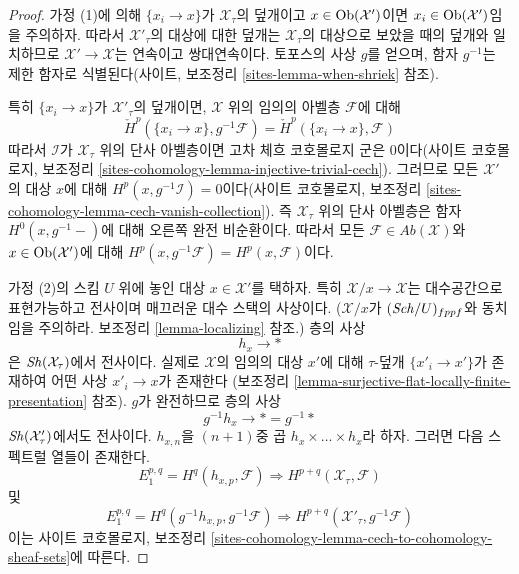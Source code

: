 \begin{proof}
가정 (1)에 의해 $\{x_i \to x\}$가 $\mathcal{X}_\tau$의 덮개이고
$x \in \mathop{\mathrm{Ob}}\nolimits(\mathcal{X}')$이면 $x_i \in \mathop{\mathrm{Ob}}\nolimits(\mathcal{X}')$임을
주의하자. 따라서 $\mathcal{X}'_\tau$의 대상에 대한 덮개는
$\mathcal{X}_\tau$의 대상으로 보았을 때의 덮개와 일치하므로
$\mathcal{X}' \to \mathcal{X}$는 연속이고 쌍대연속이다.
토포스의 사상 $g$를 얻으며, 함자 $g^{-1}$는 제한 함자로
식별된다(사이트, 보조정리 \ref{sites-lemma-when-shriek} 참조).

\medskip\noindent
특히 $\{x_i \to x\}$가 $\mathcal{X}'_\tau$의 덮개이면,
$\mathcal{X}$ 위의 임의의 아벨층 $\mathcal{F}$에 대해
$$
\check H^p(\{x_i \to x\}, g^{-1}\mathcal{F}) =
\check H^p(\{x_i \to x\}, \mathcal{F})
$$
따라서 $\mathcal{I}$가 $\mathcal{X}_\tau$ 위의 단사 아벨층이면
고차 체흐 코호몰로지 군은 0이다(사이트 코호몰로지, 보조정리
\ref{sites-cohomology-lemma-injective-trivial-cech}).
그러므로 모든 $\mathcal{X}'$의 대상 $x$에 대해
$H^p(x, g^{-1}\mathcal{I}) = 0$이다(사이트 코호몰로지, 보조정리
\ref{sites-cohomology-lemma-cech-vanish-collection}).
즉 $\mathcal{X}_\tau$ 위의 단사 아벨층은 함자
$H^0(x, g^{-1}-)$에 대해 오른쪽 완전 비순환이다.
따라서 모든 $\mathcal{F} \in \textit{Ab}(\mathcal{X})$와
$x \in \mathop{\mathrm{Ob}}\nolimits(\mathcal{X}')$에 대해
$H^p(x, g^{-1}\mathcal{F}) = H^p(x, \mathcal{F})$이다.

\medskip\noindent
가정 (2)의 스킴 $U$ 위에 놓인 대상
$x \in \mathcal{X}'$를 택하자. 특히
$\mathcal{X}/x \to \mathcal{X}$는 대수공간으로 표현가능하고
전사이며 매끄러운 대수 스택의 사상이다.
($\mathcal{X}/x$가 $(\mathit{Sch}/U)_{fppf}$와 동치임을 주의하라.
보조정리 \ref{lemma-localizing} 참조.)
층의 사상
$$
h_x \longrightarrow *
$$
은 $\mathop{\mathit{Sh}}\nolimits(\mathcal{X}_\tau)$에서 전사이다. 실제로
$\mathcal{X}$의 임의의 대상 $x'$에 대해 $\tau$-덮개
$\{x'_i \to x'\}$가 존재하여 어떤 사상 $x'_i \to x$가 존재한다
(보조정리 \ref{lemma-surjective-flat-locally-finite-presentation} 참조).
$g$가 완전하므로 층의 사상
$$
g^{-1}h_x \longrightarrow * = g^{-1}*
$$
$\mathop{\mathit{Sh}}\nolimits(\mathcal{X}'_\tau)$에서도 전사이다. $h_{x,n}$을
$(n+1)$중 곱 $h_x \times \ldots \times h_x$라 하자.
그러면 다음 스펙트럴 열들이 존재한다.
\begin{equation}
\label{equation-spectral-sequence-one}
E_1^{p, q} = H^q(h_{x, p}, \mathcal{F}) \Rightarrow
H^{p + q}(\mathcal{X}_\tau, \mathcal{F})
\end{equation}
및
\begin{equation}
\label{equation-spectral-sequence-two}
E_1^{p, q} = H^q(g^{-1}h_{x, p}, g^{-1}\mathcal{F}) \Rightarrow
H^{p + q}(\mathcal{X}'_\tau, g^{-1}\mathcal{F})
\end{equation}
이는 사이트 코호몰로지, 보조정리
\ref{sites-cohomology-lemma-cech-to-cohomology-sheaf-sets}에 따른다.


\end{proof}
